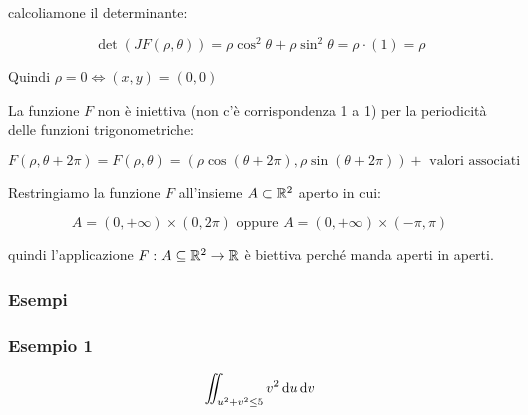calcoliamone il determinante:

\[
    \det(JF(\rho,\theta)) = \rho \cos^{2}\theta + \rho\sin^{2}\theta = \rho \cdot (1) = \rho
\]

Quindi \(\rho=0 \iff (x,y) = (0,0)\)

La funzione \(F\) non è iniettiva (non c'è corrispondenza 1 a 1) per la periodicità delle funzioni trigonometriche:

\[
    F(\rho, \theta + 2\pi) = F(\rho,\theta) = (\rho \cos (\theta+ 2\pi), \rho \sin (\theta + 2\pi)) + \text{ valori associati}
\]

Restringiamo la funzione \(F\) all'insieme \(A \subset \mathbb{R}^2\) aperto in cui:

\[
    A = (0, +\infty) \times (0, 2\pi) \text{ oppure } A=(0, +\infty) \times (-\pi, \pi)
\]

quindi l'applicazione \(F: A \subseteq \mathbb{R}^2 \to \mathbb{R} \) è biettiva perché manda aperti in aperti.


\pagebreak
\subsubsection{Esempi}

\subsubsection*{Esempio 1}

\[
    \iint_{u^{2}+v^{2} \le 5} v^{2} \mathop{}\!\mathrm{d}{u}\mathop{}\!\mathrm{d}{v}
\]

